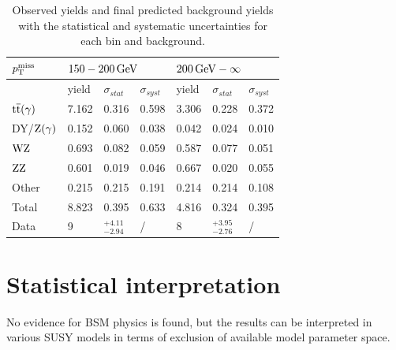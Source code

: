 \begin{table}[tbp]
 \centering
 \caption{Observed yields and final predicted background yields with the statistical and systematic uncertainties for each bin and background.}
 \normalsize
 \label{tab:results}
 \begin{tabular}{lllllll}
  $p_{\mathrm{T}}^\text{miss}$      & \multicolumn{3}{l}{$150-200\,\text{Ge\hspace{-.08em}V}$} & \multicolumn{3}{l}{$200\,\text{Ge\hspace{-.08em}V}-\infty$}                                                                  \\\hline
                 & yield                             & $\sigma_{stat}$                      & $\sigma_{syst}$ & yield & $\sigma_{stat}$    & $\sigma_{syst}$ \\\hline
  ${\mathrm{t}\overline{\mathrm{t}}}(\gamma)$ & 7.162                             & 0.316                                & 0.598           & 3.306 & 0.228              & 0.372           \\
  DY/$\mathrm{Z}(\gamma)$ & 0.152                             & 0.060                                & 0.038           & 0.042 & 0.024              & 0.010           \\
  $\mathrm{W}\mathrm{Z}$       & 0.693                             & 0.082                                & 0.059           & 0.587 & 0.077              & 0.051           \\
  $\mathrm{Z}\mathrm{Z}$       & 0.601                             & 0.019                                & 0.046           & 0.667 & 0.020              & 0.055           \\
  Other          & 0.215                             & 0.215                                & 0.191           & 0.214 & 0.214              & 0.108           \\\hline
  Total          & 8.823                             & 0.395                                & 0.633           & 4.816 & 0.324              & 0.395           \\\hline
  Data           & 9                                 & $^{+4.11}_{-2.94}$                   & /               & 8     & $^{+3.95}_{-2.76}$ & /               \\\hline
 \end{tabular}
\end{table}


\section{Statistical interpretation}
No evidence for BSM physics is found, but the results can be interpreted in various SUSY models in terms of exclusion of available model parameter space.
